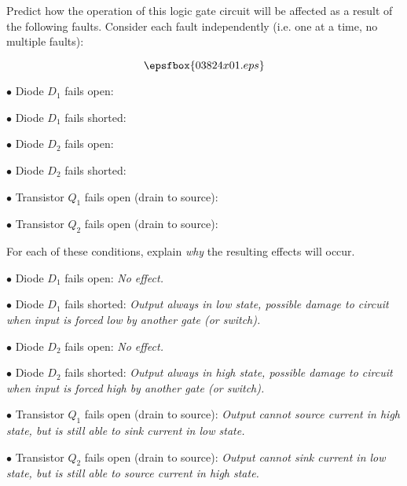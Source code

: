 

Predict how the operation of this logic gate circuit will be affected as a result of the following faults.  Consider each fault independently (i.e. one at a time, no multiple faults):

$$\epsfbox{03824x01.eps}$$

\medskip
\item{$\bullet$} Diode $D_1$ fails open:
\vskip 5pt
\item{$\bullet$} Diode $D_1$ fails shorted:
\vskip 5pt
\item{$\bullet$} Diode $D_2$ fails open:
\vskip 5pt
\item{$\bullet$} Diode $D_2$ fails shorted:
\vskip 5pt
\item{$\bullet$} Transistor $Q_1$ fails open (drain to source):
\vskip 5pt
\item{$\bullet$} Transistor $Q_2$ fails open (drain to source):
\medskip

For each of these conditions, explain {\it why} the resulting effects will occur.







\medskip
\item{$\bullet$} Diode $D_1$ fails open: {\it No effect.}
\vskip 5pt
\item{$\bullet$} Diode $D_1$ fails shorted: {\it Output always in low state, possible damage to circuit when input is forced low by another gate (or switch).}
\vskip 5pt
\item{$\bullet$} Diode $D_2$ fails open: {\it No effect.}
\vskip 5pt
\item{$\bullet$} Diode $D_2$ fails shorted: {\it Output always in high state, possible damage to circuit when input is forced high by another gate (or switch).}
\vskip 5pt
\item{$\bullet$} Transistor $Q_1$ fails open (drain to source): {\it Output cannot source current in high state, but is still able to sink current in low state.}
\vskip 5pt
\item{$\bullet$} Transistor $Q_2$ fails open (drain to source): {\it Output cannot sink current in low state, but is still able to source current in high state.}
\medskip


